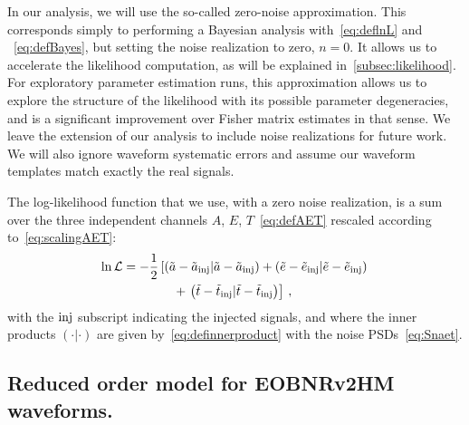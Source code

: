 \documentclass[aps,showpacs,twocolumn,prd,superscriptaddress,nofootinbib]{revtex4-1}
\newcommand\calL{{\mathcal{L}}}
\newcommand{\nn}{\nonumber}
\begin{document}
In our analysis, we will use the so-called zero-noise approximation. This corresponds simply to performing a Bayesian analysis with~\eqref{eq:deflnL} and ~\eqref{eq:defBayes}, but setting the noise realization to zero, $n=0$. It allows us to accelerate the likelihood computation, as will be explained in~\ref{subsec:likelihood}. For exploratory parameter estimation runs, this approximation allows us to explore the structure of the likelihood with its possible parameter degeneracies, and is a significant improvement over Fisher matrix estimates in that sense. We leave the extension of our analysis to include noise realizations for future work. We will also ignore waveform systematic errors and assume our waveform templates match exactly the real signals.

The log-likelihood function that we use, with a zero noise realization, is a sum over the three independent channels $A$, $E$, $T$~\eqref{eq:defAET} rescaled according to~\eqref{eq:scalingAET}: 
\begin{align}\label{eq:deflnLaet}
	\ln\calL &= -\frac{1}{2} \left[ \left( \tilde{a} - \tilde{a}_{\rm inj} | \tilde{a} - \tilde{a}_{\rm inj}  \right) + \left( \tilde{e} - \tilde{e}_{\rm inj} | \tilde{e} - \tilde{e}_{\rm inj}  \right) \right. \nn\\
	& \qquad\qquad + \left. \left( \tilde{t} - \tilde{t}_{\rm inj} | \tilde{t} - \tilde{t}_{\rm inj} \right) \right] \,,
\end{align}
with the $\rm inj$ subscript indicating the injected signals, and where the inner products $(\cdot | \cdot)$ are given by~\eqref{eq:definnerproduct} with the noise PSDs~\eqref{eq:Snaet}.



\subsection{Reduced order model for EOBNRv2HM waveforms.}
\label{subsec:ROM}
\end{document}

